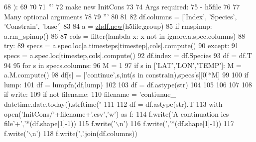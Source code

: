 \begin{DoxyCode}
68     ):
69 
70 
71     \textcolor{stringliteral}{'''}
72 \textcolor{stringliteral}{    make new InitCons}
73 \textcolor{stringliteral}{}
74 \textcolor{stringliteral}{    Args required:}
75 \textcolor{stringliteral}{     - h5file}
76 \textcolor{stringliteral}{}
77 \textcolor{stringliteral}{     Many optional arguments}
78 \textcolor{stringliteral}{}
79 \textcolor{stringliteral}{     '''}
80 
81 
82     df.columns =  [\textcolor{stringliteral}{'Index'}, \textcolor{stringliteral}{'Species'}, \textcolor{stringliteral}{'Constrain'}, \textcolor{stringliteral}{'base'}]
83 
84     a = \mbox{\hyperlink{classzhdf_1_1new}{zhdf.new}}(h5file,group)
85     \textcolor{keywordflow}{if} rmspinup: a.rm\_spinup()
86 
87     cols = filter(\textcolor{keyword}{lambda} x: x \textcolor{keywordflow}{not} \textcolor{keywordflow}{in} ignore,a.spec.columns)
88     \textcolor{keywordflow}{try}:
89         specs = a.spec.loc[a.timesteps[timestep],cols].compute()
90     \textcolor{keywordflow}{except}:
91         specs = a.spec.loc[timestep,cols].compute()
92     df.index = df.Species
93     df = df.T
94 
95     \textcolor{keywordflow}{for} s \textcolor{keywordflow}{in} specs.columns:
96         M = 1
97         \textcolor{keywordflow}{if} s \textcolor{keywordflow}{in} [\textcolor{stringliteral}{'LAT'},\textcolor{stringliteral}{'LON'},\textcolor{stringliteral}{'TEMP'}]: M = a.M.compute()
98         df[s] = [\textcolor{stringliteral}{'continue'},s,int(s \textcolor{keywordflow}{in} constrain),specs[s][0]*M]
99 
100     \textcolor{keywordflow}{if} lump:
101         df = lumpfn(df,lump)
102 
103     df = df.astype(str)
104 
105 
106 
107 
108     \textcolor{keywordflow}{if} write:
109         \textcolor{keywordflow}{if} \textcolor{keywordflow}{not} filename:
110                 filename = \textcolor{stringliteral}{'contiunue\_%
      datetime.date.today().strftime(\textcolor{stringliteral}{"%
111 
112         df = df.astype(str).T
113         with open(\textcolor{stringliteral}{'InitCons/'}+filename+\textcolor{stringliteral}{'.csv'},\textcolor{stringliteral}{'w'}) \textcolor{keyword}{as} f:
114             f.write(\textcolor{stringliteral}{'A continuation ics file'}+\textcolor{stringliteral}{','}*(df.shape[1]-1))
115             f.write(\textcolor{stringliteral}{'\(\backslash\)n'})
116             f.write(\textcolor{stringliteral}{','}*(df.shape[1]-1))
117             f.write(\textcolor{stringliteral}{'\(\backslash\)n'})
118             f.write(\textcolor{stringliteral}{','}.join(df.columns))
}}
\end{DoxyCode}
